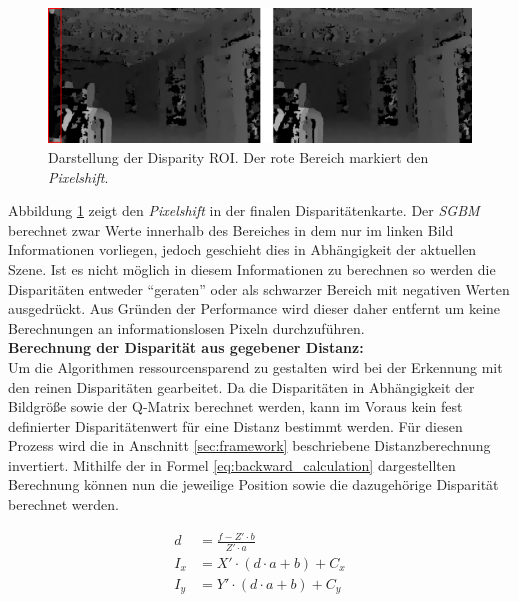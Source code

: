 	\begin{figure}[h]
		\centering
			\includegraphics[width=13.5cm]{img/evaluation/pixelshift}
		\caption{Darstellung der Disparity ROI. Der rote Bereich markiert den \emph{Pixelshift}.}
		\label{fig:dmap_roi}
	\end{figure}

\noindent
Abbildung \ref{fig:dmap_roi} zeigt den \emph{Pixelshift} in der finalen Disparitätenkarte. Der \emph{SGBM} berechnet zwar Werte innerhalb des Bereiches in dem nur im linken Bild Informationen vorliegen, jedoch geschieht dies in Abhängigkeit der aktuellen Szene. Ist es nicht möglich in diesem Informationen zu berechnen so werden die Disparitäten entweder \enquote{geraten} oder als schwarzer Bereich mit negativen Werten ausgedrückt. Aus Gründen der Performance wird dieser daher entfernt um keine Berechnungen an informationslosen Pixeln durchzuführen.\\
	
\noindent
\textbf{Berechnung der Disparität aus gegebener Distanz:}\\
\noindent
Um die Algorithmen ressourcensparend zu gestalten wird bei der Erkennung mit den reinen Disparitäten gearbeitet. Da die Disparitäten in Abhängigkeit der Bildgröße sowie der Q-Matrix berechnet werden, kann im Voraus kein fest definierter Disparitätenwert für eine Distanz bestimmt werden. Für diesen Prozess wird die in Anschnitt \ref{sec:framework} beschriebene Distanzberechnung invertiert. Mithilfe der in Formel \ref{eq:backward_calculation} dargestellten Berechnung können nun die jeweilige Position sowie die dazugehörige Disparität berechnet werden.

\begin{equation}
  \label{eq:backward_calculation}
  \begin{aligned}
    d &= \frac{f- Z' \cdot b}{Z' \cdot a}\\
    I_x &= X' \cdot (d \cdot a + b) + C_x\\
    I_y &= Y' \cdot (d \cdot a + b) + C_y
  \end{aligned}
\end{equation}

